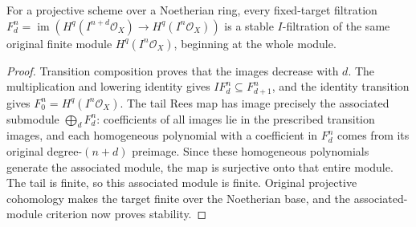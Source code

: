 \begin{lemma}
\label{lem:fc-formal-functions-fixed-target-stable}
\leanok
{}
For a projective scheme over a Noetherian ring, every fixed-target
filtration
$F^n_d=\operatorname{im}(H^q(I^{n+d}\mathcal O_X)\to H^q(I^n\mathcal O_X))$
is a stable $I$-filtration of the same original finite module
$H^q(I^n\mathcal O_X)$, beginning at the whole module.
\end{lemma}
\begin{proof}
Transition composition proves that the images decrease with $d$.
The multiplication and lowering identity gives
$IF^n_d\subseteq F^n_{d+1}$, and the identity transition gives
$F^n_0=H^q(I^n\mathcal O_X)$.  The tail Rees map has image precisely
the associated submodule $\bigoplus_d F^n_d$: coefficients of all
images lie in the prescribed transition images, and each homogeneous
polynomial with a coefficient in $F^n_d$ comes from its original
degree-$(n+d)$ preimage.  Since these homogeneous polynomials generate
the associated module, the map is surjective onto that entire module.
The tail is finite, so this associated module is finite.  Original
projective cohomology makes the target finite over the Noetherian base,
and the associated-module criterion now proves stability.
\end{proof}
